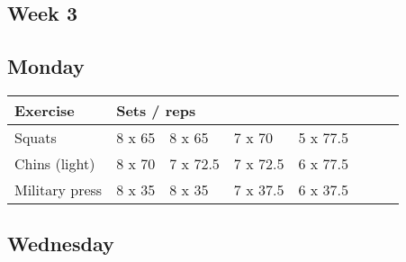 \documentclass[12pt, a4paper]{article}%
\begin{document}
 \subsection*{\hspace{0.25em} Week 3 }
  \subsection*{\hspace{0.5em} Monday }


  \begin{tabular}{l|lllllll}
  \hspace{0.75em} \textbf{Exercise} & \multicolumn{ 7 }{l}{ \textbf{Sets / reps} } \\ \hline

            \hspace{0.75em} Squats
            & 8 x 65
            & 8 x 65
            & 7 x 70
            & 5 x 77.5
            & 
            & 
            & 
            \\


            \hspace{0.75em} Chins (light)
            & 8 x 70
            & 7 x 72.5
            & 7 x 72.5
            & 6 x 77.5
            & 
            & 
            & 
            \\


            \hspace{0.75em} Military press
            & 8 x 35
            & 8 x 35
            & 7 x 37.5
            & 6 x 37.5
            & 
            & 
            & 
            \\


  \end{tabular}

  \subsection*{\hspace{0.5em} Wednesday }
\end{document}
